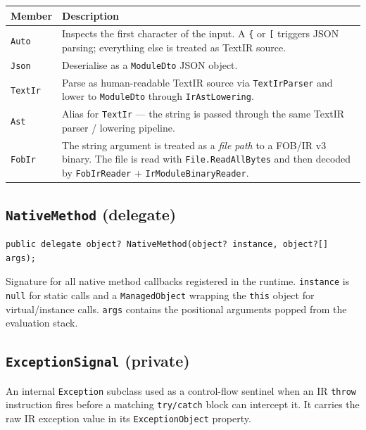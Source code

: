 \documentclass[11pt,a4paper]{article}
\newcommand{\code}[1]{\texttt{\small #1}}
\newcommand{\typename}[1]{\textcolor{typecolor}{\texttt{\small #1}}}
\begin{document}
\begin{longtable}{lp{9cm}}
  \toprule
  \textbf{Member} & \textbf{Description} \\
  \midrule
  \endhead
  \code{Auto}    & Inspects the first character of the input. A \texttt{\{} or
                   \texttt{[} triggers JSON parsing; everything else is treated as
                   TextIR source. \\[0.3em]
  \code{Json}    & Deserialise as a \typename{ModuleDto} JSON object. \\[0.3em]
  \code{TextIr}  & Parse as human-readable TextIR source via \typename{TextIrParser}
                   and lower to \typename{ModuleDto} through \typename{IrAstLowering}. \\[0.3em]
  \code{Ast}     & Alias for \code{TextIr} --- the string is passed through the
                   same TextIR parser / lowering pipeline. \\[0.3em]
  \code{FobIr}   & The string argument is treated as a \emph{file path} to a FOB/IR
                   v3 binary. The file is read with
                   \code{File.ReadAllBytes} and then decoded by
                   \typename{FobIrReader} + \typename{IrModuleBinaryReader}. \\
  \bottomrule
\end{longtable}

\subsection{\texttt{NativeMethod} (delegate)}

\begin{lstlisting}[style=cs]
public delegate object? NativeMethod(object? instance, object?[] args);
\end{lstlisting}

Signature for all native method callbacks registered in the runtime. \code{instance}
is \code{null} for static calls and a \typename{ManagedObject} wrapping the \code{this}
object for virtual/instance calls. \code{args} contains the positional arguments popped
from the evaluation stack.

\subsection{\texttt{ExceptionSignal} (private)}

An internal \typename{Exception} subclass used as a control-flow sentinel when an IR
\code{throw} instruction fires before a matching \code{try/catch} block can intercept it.
It carries the raw IR exception value in its \code{ExceptionObject} property.
\end{document}
